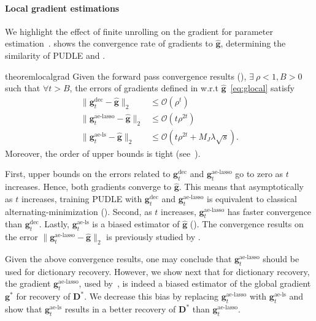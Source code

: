 \documentclass[10pt]{article} %
\newcommand{\D}{{\bm D}}
\newcommand{\g}{{\bm g}}
\begin{document}
\paragraph{Local gradient estimations} We highlight the effect of finite unrolling on the gradient for parameter estimation~\citep{ablin2020super}.  shows the convergence rate of gradients to $\hat \g$, determining the similarity of PUDLE and .
%
\begin{restatable}{theorem}{localgrad}\label{thm:localgradient}
Given the forward pass convergence results (), $\exists\ \rho <1, B > 0$ such that $\forall t > B$, the errors of gradients defined in  w.r.t $\hat \g$~\eqref{eq:glocal} satisfy
\begin{equation}\label{eq:localconv}
\begin{aligned}
\| \g_t^{\text{dec}} - \hat \g \|_2 &\leq \mathcal{O}(\rho^t)\\ 
\| \g_t^{\text{ae-lasso}}  - \hat \g \|_2 &\leq \mathcal{O}(t \rho^{2t})\\
\| \g_t^{\text{ae-ls}}  - \hat \g \|_2 &\leq \mathcal{O}(t \rho^{2t} + M_J \lambda \sqrt{s}).
\end{aligned}
\end{equation}
%
Moreover, the order of upper bounds is tight (see~). 
\end{restatable}
%
First, upper bounds on the errors related to $\g_t^{\text{dec}}$ and $\g_t^{\text{ae-lasso}}$ go to zero as $t$ increases. Hence, both gradients converge to $\hat \g$. This means that asymptotically as $t$ increases, training PUDLE with $\g_t^{\text{dec}}$ and $\g_t^{\text{ae-lasso}}$ is equivalent to classical alternating-minimization (). Second, as $t$ increases, $\g_t^{\text{ae-lasso}}$ has faster convergence than $\g_t^{\text{dec}}$. Lastly, $\g_t^{\text{ae-ls}}$ is a biased estimator of $\hat \g$ (). The convergence results on the error $\| \g_t^{\text{ae-lasso}}  - \hat \g \|_2$ is previously studied by \citet{malezieux2022understanding}.

Given the above convergence results, one may conclude that $\g_t^{\text{ae-lasso}}$ should be used for dictionary recovery. However, we show next that for dictionary recovery, the gradient $\g_t^{\text{ae-lasso}}$, used by~\citet{malezieux2022understanding}, is indeed a biased estimator of the global gradient $\g^{\ast}$ for recovery of $\D^{\ast}$. We decrease this bias by replacing $\g_t^{\text{ae-lasso}}$ with $\g_t^{\text{ae-ls}}$ and show that $\g_t^{\text{ae-ls}}$ results in a better recovery of $\D^{\ast}$ than $\g_t^{\text{ae-lasso}}$.
%
%
\end{document}
